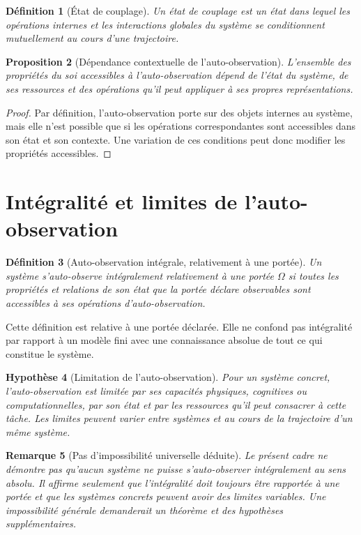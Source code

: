 \documentclass[11pt,a4paper,openany]{book}
\newtheorem{definition}{Définition}[chapter]
\newtheorem{hypothesis}[definition]{Hypothèse}
\newtheorem{proposition}[definition]{Proposition}
\newtheorem{remark}[definition]{Remarque}
\begin{document}
\begin{definition}[État de couplage]
Un état de couplage est un état dans lequel les opérations internes et les interactions globales du système se conditionnent mutuellement au cours d'une trajectoire.
\end{definition}

\begin{proposition}[Dépendance contextuelle de l'auto-observation]
L'ensemble des propriétés du soi accessibles à l'auto-observation dépend de l'état du système, de ses ressources et des opérations qu'il peut appliquer à ses propres représentations.
\end{proposition}
\begin{proof}
Par définition, l'auto-observation porte sur des objets internes au système, mais elle n'est possible que si les opérations correspondantes sont accessibles dans son état et son contexte. Une variation de ces conditions peut donc modifier les propriétés accessibles.\end{proof}

\section{Intégralité et limites de l'auto-observation}
\begin{definition}[Auto-observation intégrale, relativement à une portée]
Un système s'auto-observe intégralement relativement à une portée $\Omega$ si toutes les propriétés et relations de son état que la portée déclare observables sont accessibles à ses opérations d'auto-observation.
\end{definition}

Cette définition est relative à une portée déclarée. Elle ne confond pas intégralité par rapport à un modèle fini avec une connaissance absolue de tout ce qui constitue le système.

\begin{hypothesis}[Limitation de l'auto-observation]
Pour un système concret, l'auto-observation est limitée par ses capacités physiques, cognitives ou computationnelles, par son état et par les ressources qu'il peut consacrer à cette tâche. Les limites peuvent varier entre systèmes et au cours de la trajectoire d'un même système.
\end{hypothesis}

\begin{remark}[Pas d'impossibilité universelle déduite]
Le présent cadre ne démontre pas qu'aucun système ne puisse s'auto-observer intégralement au sens absolu. Il affirme seulement que l'intégralité doit toujours être rapportée à une portée et que les systèmes concrets peuvent avoir des limites variables. Une impossibilité générale demanderait un théorème et des hypothèses supplémentaires.
\end{remark}
\end{document}
